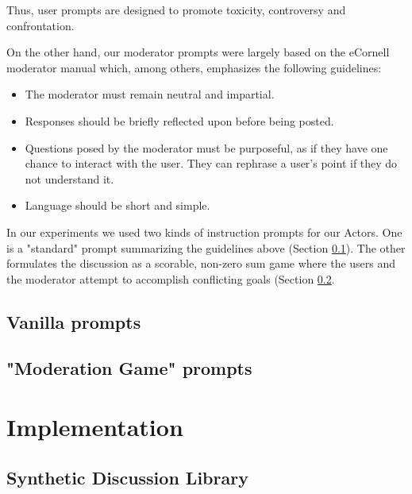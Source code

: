 Thus, user prompts are designed to promote toxicity, controversy and confrontation.

On the other hand, our moderator prompts were largely based on the eCornell moderator manual \cite{Cornell_eRulemaking2017} which, among others, emphasizes the following guidelines:

\begin{itemize}
	\item The moderator must remain neutral and impartial. 
	
	\item Responses should be briefly reflected upon before being posted.
	
	\item Questions posed by the moderator must be purposeful, as if they have one chance to interact with the user. They can rephrase a user's point if they do not understand it.
	
	\item Language should be short and simple.
\end{itemize}

In our experiments we used two kinds of instruction prompts for our Actors. One is a "standard" prompt summarizing the guidelines above (Section \ref{ssec:system:vanilla-prompt}). The other formulates the discussion as a scorable, non-zero sum game where the users and the moderator attempt to accomplish conflicting goals (Section \ref{ssec:system:game-prompt}.

\subsection{Vanilla prompts}
\label{ssec:system:vanilla-prompt}

\subsection{"Moderation Game" prompts}
\label{ssec:system:game-prompt}



\section{Implementation}
\label{sec:system:implementation}

\subsection{Synthetic Discussion Library}
\label{ssec:system:library}

